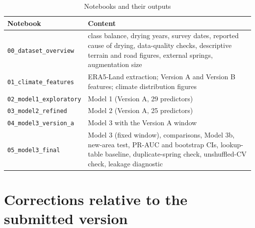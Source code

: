 \documentclass[12pt,a4paper]{article}
\begin{document}
\begin{table}[htbp]
\centering
\small
\caption{Notebooks and their outputs}
\label{tab:notebooks}
\begin{tabularx}{\linewidth}{LL}
\toprule
\textbf{Notebook} & \textbf{Content} \\
\midrule
\texttt{00\_\allowbreak{}dataset\_\allowbreak{}overview} & class balance, drying years, survey dates, reported cause of drying, data-quality checks, descriptive terrain and road figures, external springs, augmentation size \\
\texttt{01\_\allowbreak{}climate\_\allowbreak{}features} & ERA5-Land extraction; Version A and Version B features; climate distribution figures \\
\texttt{02\_\allowbreak{}model1\_\allowbreak{}exploratory} & Model 1 (Version A, 29 predictors) \\
\texttt{03\_\allowbreak{}model2\_\allowbreak{}refined} & Model 2 (Version A, 25 predictors) \\
\texttt{04\_\allowbreak{}model3\_\allowbreak{}version\_\allowbreak{}a} & Model 3 with the Version A window \\
\texttt{05\_\allowbreak{}model3\_\allowbreak{}final} & Model 3 (fixed window), comparisons, Model 3b, new-area test, PR-AUC and bootstrap CIs, lookup-table baseline, duplicate-spring check, unshuffled-CV check, leakage diagnostic \\
\bottomrule
\end{tabularx}
\end{table}

\clearpage
\section{Corrections relative to the submitted version}\label{sec:appendix-corrections}
\end{document}

